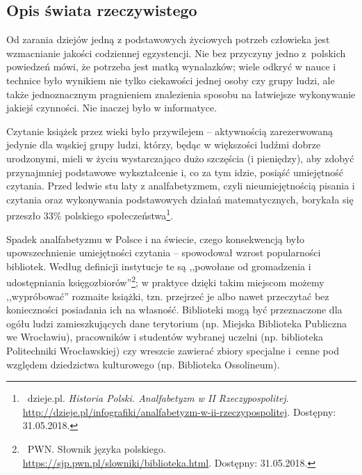 \documentclass[12pt, a4paper]{article}
\begin{document}
\subsection{Opis świata rzeczywistego}
Od zarania dziejów jedną z podstawowych życiowych potrzeb człowieka jest wzmacnianie jakości codziennej egzystencji. Nie bez przyczyny jedno z~polskich powiedzeń mówi, że potrzeba jest matką wynalazków; wiele odkryć w nauce i technice było wynikiem nie tylko ciekawości jednej osoby czy grupy ludzi, ale także jednoznacznym pragnieniem znalezienia sposobu na łatwiejsze wykonywanie jakiejś czynności. Nie inaczej było w informatyce.

Czytanie książek przez wieki było przywilejem -- aktywnością zarezerwowaną jedynie dla wąskiej grupy ludzi, którzy, będąc w większości ludźmi dobrze urodzonymi, mieli w życiu wystarczająco dużo szczęścia (i pieniędzy), aby zdobyć przynajmniej podstawowe wykształcenie i, co za tym idzie, posiąść umiejętność czytania. Przed ledwie stu laty z analfabetyzmem, czyli nieumiejętnością pisania i czytania oraz wykonywania podstawowych działań matematycznych, borykała się przeszło $33\%$ polskiego społeczeństwa\footnote{\ dzieje.pl. \textit{Historia Polski. Analfabetyzm w II Rzeczypospolitej}. \url{http://dzieje.pl/infografiki/analfabetyzm-w-ii-rzeczypospolitej}. Dostępny: 31.05.2018.}.

Spadek analfabetyzmu w Polsce i na świecie, czego konsekwencją było upowszechnienie umiejętności czytania -- spowodował wzrost popularności bibliotek. Według definicji instytucje te są ,,powołane od gromadzenia i udostępniania księgozbiorów''\footnote{\ PWN. Słownik języka polskiego. \url{https://sjp.pwn.pl/slowniki/biblioteka.html}. Dostępny: 31.05.2018.}; w praktyce dzięki takim miejscom możemy ,,wypróbować'' rozmaite książki, tzn. przejrzeć je albo nawet przeczytać bez konieczności posiadania ich na własność. Biblioteki mogą być przeznaczone dla ogółu ludzi zamieszkujących dane terytorium (np. Miejska Biblioteka Publiczna we Wrocławiu), pracowników i studentów wybranej uczelni (np. biblioteka Politechniki Wrocławskiej) czy wreszcie zawierać zbiory specjalne i~cenne pod względem dziedzictwa kulturowego (np. Biblioteka Ossolineum).
\end{document}
